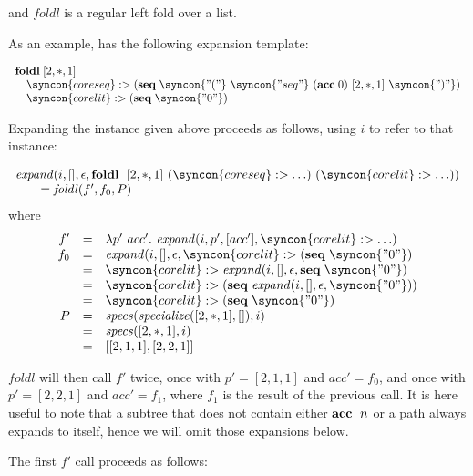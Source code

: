 \documentclass{kththesis}
\begin{document}
and $\mathit{foldl}$ is a regular left fold over a list.

As an example,  has the following expansion template:

$$
\begin{array}{l}
\foldl [2, *, 1] \\
\quad \syncon{coreseq} :> (\seq \syncon{"("}\ \syncon{"seq"}\ (\acc 0)\ [2, *, 1]\ \syncon{")"}) \\
\quad \syncon{corelit} :> (\seq \syncon{"0"}) \\
\end{array}
$$

Expanding the instance given above proceeds as follows, using $i$ to refer to that instance:

$$
\begin{array}{l}
\expand(i, [], \epsilon, \foldl~[2, *, 1]~(\syncon{coreseq} :> \ldots)~(\syncon{corelit} :> \ldots)) \\
\qquad = \mathit{foldl}(f', f_0, P) \\
\end{array}
$$
where
$$
\begin{array}{rcl}
f' & = & \lambda p'~acc'.~ \expand(i, p', [acc'], \syncon{corelit} :> \ldots) \\
f_0 & = & \expand(i, [], \epsilon, \syncon{corelit} :> (\seq \syncon{"0"}) \\
& = & \syncon{corelit} :> \expand(i, [], \epsilon, \seq \syncon{"0"}) \\
& = & \syncon{corelit} :> (\seq \expand(i, [], \epsilon, \syncon{"0"})) \\
& = & \syncon{corelit} :> (\seq \syncon{"0"}) \\
P & = & \specs(\specialize([2, *, 1], []), i) \\
& = & \specs([2, *, 1], i) \\
& = & [[2, 1, 1], [2, 2, 1]] \\
\end{array}
$$

$\mathit{foldl}$ will then call $f'$ twice, once with $p' = [2, 1, 1]$ and $acc' = f_0$, and once with $p' = [2, 2, 1]$ and $acc' = f_1$, where $f_1$ is the result of the previous call. It is here useful to note that a subtree that does not contain either $\mathrel{\mathbf{acc}}~n$ or a path always expands to itself, hence we will omit those expansions below.

The first $f'$ call proceeds as follows:
\end{document}
